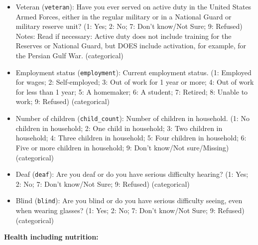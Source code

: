 \documentclass[
]{article}
\begin{document}
\begin{itemize}
\begin{itemize}
  \item
    Veteran (\texttt{veteran}): Have you ever served on active duty in the United States Armed Forces, either in the regular military or in a National Guard or military reserve unit? (1: Yes; 2: No; 7: Don't know/Not Sure; 9: Refused) Notes: Read if necessary: Active duty does not include training for the Reserves or National Guard, but DOES include activation, for example, for the Persian Gulf War. (categorical)
  \item
    Employment status (\texttt{employment}): Current employment status. (1: Employed for wages; 2: Self-employed; 3: Out of work for 1 year or more; 4: Out of work for less than 1 year; 5: A homemaker; 6: A student; 7: Retired; 8: Unable to work; 9: Refused) (categorical)
  \item
    Number of children (\texttt{child\_count}): Number of children in household. (1: No children in household; 2: One child in household; 3: Two children in household; 4: Three children in household; 5: Four children in household; 6: Five or more children in household; 9: Don't know/Not sure/Missing) (categorical)
  \item
    Deaf (\texttt{deaf}): Are you deaf or do you have serious difficulty hearing? (1: Yes; 2: No; 7: Don't know/Not Sure; 9: Refused) (categorical)
  \item
    Blind (\texttt{blind}): Are you blind or do you have serious difficulty seeing, even when wearing glasses? (1: Yes; 2: No; 7: Don't know/Not Sure; 9: Refused) (categorical)
  \end{itemize}
\end{itemize}

\textbf{Health including nutrition:}
\end{document}
